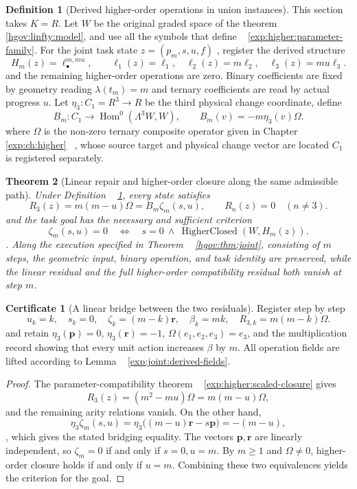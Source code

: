 \documentclass[12pt,a4paper,openany,notitlepage]{report}
\theoremstyle{plain}
\newtheorem{theorem}{Theorem}[chapter]
\theoremstyle{definition}
\newtheorem{definition}[theorem]{Definition}
\newtheorem*{certificate}{Certificate}
\theoremstyle{remark}
\def\mathcal#1{#1}\def\mathsf#1{#1}\def\mathbb#1{#1}%
\begin{document}
\begin{CJK*}
\begin{definition}
[Derived higher-order operations in union instances]\label{exp:joint:algebra-lift}
This section takes $\mathbb K=\mathbb R$. Let $W$ be the original graded space of the theorem ~ \ref{hgov:linfty:model}, and use all the symbols that define ~ \ref{exp:higher:parameter-family}. For the joint task state $z=(p_m,s,u,f)$ , register the derived structure \[
 H_m(z)=\ell_\bullet^{m,mu},\qquad
 \ell_1(z)=\ell_1,\quad
 \ell_2(z)=m\ell_2,\quad
 \ell_3(z)=mu\ell_3.
\] and the remaining higher-order operations are zero. Binary coefficients are fixed by geometry reading $\lambda(t_m)=m$ and ternary coefficients are read by actual progress $u$. Let $\eta_3:C_1=\mathbb R^3\to\mathbb R$ be the third physical change coordinate, define \[
 \mathcal B_m:C_1\longrightarrow
 \operatorname{Hom}^{0}(\Lambda^3W,W),\qquad
 \mathcal B_m(v)=-m\eta_3(v)\Omega.
\] where $\Omega$ is the non-zero ternary composite operator given in Chapter ~ \ref{exp:ch:higher} ~, whose source target and physical change vector are located $C_1$ is registered separately.\end{definition}


\begin{theorem} [Linear repair and higher-order closure along the same admissible path]
\label{exp:joint:simultaneous-repair}
Under Definition ~ \ref{exp:joint:algebra-lift}, every state satisfies
\[
 \mathcal R_3(z)=m(m-u)\Omega
 =\mathcal B_m\zeta_m(s,u),\qquad
 \mathcal R_n(z)=0\quad(n\ne3).
\]
and the task goal has the necessary and sufficient criterion
\[
 \zeta_m(s,u)=0
 \quad\Longleftrightarrow\quad
 s=0\ \land\ \operatorname{HigherClosed}(W,H_m(z)).
\].
Along the execution specified in Theorem ~ \ref{hgov:thm:joint}, consisting of $m$ steps, the geometric input, binary operation, and task identity are preserved, while the linear residual and the full higher-order compatibility residual both vanish at step $m$.
\end{theorem}
\begin{certificate} [A linear bridge between the two residuals]
Register step by step
\[
 u_k=k,\quad s_k=0,\quad
 \zeta_k=(m-k)\mathbf r,\quad
 \beta_k=mk,\quad
 \mathcal R_{3,k}=m(m-k)\Omega.
\]
and retain $\eta_3(\mathbf p)=0$, $\eta_3(\mathbf r)=-1$, $\Omega(e_1,e_2,e_3)=e_3$, and the multiplication record showing that every unit action increases $\beta$ by $m$. All operation fields are lifted according to Lemma ~ \ref{exp:joint:derived-fields}.
\end{certificate}
\begin{proof}
The parameter-compatibility theorem ~ \ref{exp:higher:scaled-closure} gives
\[
 \mathcal R_3(z)=(m^2-mu)\Omega=m(m-u)\Omega,
\]
and the remaining arity relations vanish. On the other hand,
\[
 \eta_3\zeta_m(s,u)
 =\eta_3\bigl((m-u)\mathbf r-s\mathbf p\bigr)=-(m-u),
\],
which gives the stated bridging equality. The vectors $\mathbf p,\mathbf r$ are linearly independent, so $\zeta_m=0$ if and only if $s=0,u=m$. By $m\ge1$ and $\Omega\ne0$, higher-order closure holds if and only if $u=m$. Combining these two equivalences yields the criterion for the goal.


\end{proof}
\end{CJK*}
\end{document}
